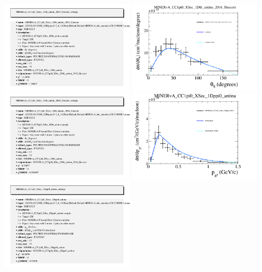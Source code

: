 \documentclass{article}
\begin{document}
\includegraphics[width=0.49\textwidth]{figures/nuisance_MINERvA_CC1pi0_XSec_1Dth_antinu_2015_fluxcorr_info.png}
\centering
\includegraphics[width=0.49\textwidth]{figures/nuisance_MINERvA_CC1pi0_XSec_1Dth_antinu_2016_fluxcorr_comp.png}
\includegraphics[width=0.49\textwidth]{figures/nuisance_MINERvA_CC1pi0_XSec_1Dth_antinu_2016_fluxcorr_info.png}
\centering
\includegraphics[width=0.49\textwidth]{figures/nuisance_MINERvA_CC1pi0_XSec_1Dppi0_antinu_comp.png}
\includegraphics[width=0.49\textwidth]{figures/nuisance_MINERvA_CC1pi0_XSec_1Dppi0_antinu_info.png}
\end{document}
